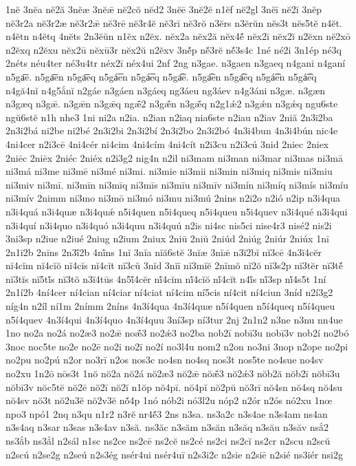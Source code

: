 {1nĕ
3nĕa
nĕ2ă
3nĕæ
3nĕǣ
nĕ2cŏ
nĕd2
3nĕē
3nĕ2ĕ
n1ĕf
nĕ2gl
3nĕī
nĕ2ĭ
3nĕp
nĕ3r2a
nĕ3r2æ
nĕ3r2ǣ
nĕ3rē
nĕ3r4ĕ
nĕ3rī
nĕ3rŏ
n3ĕrs
n3ĕrŭn
nĕs3t
nĕs5tĕ
n4ĕt.
n4ĕtn
n4ĕtq
4nĕts
2n3ĕŭn
n1ĕx
n2ĕx.
nĕx2a
nĕx2ă
nĕx4ĕ́
nĕx2ī
nĕx2ĭ
n2ĕxn
nĕ2xō
n2ĕxq
n2ĕxu
nĕx2ū
nĕxū3r
nĕx2ŭ
n2ĕxv
3nĕ́p
nĕ́3rĕ
nĕ́3s4c
1né
né2i
3n1ép
né3q
2néts
néu4ter
né3u4tr
néx2ī
néx4ui
2nf
2ng
n3gae.
n3gaen
n3gaeq
n4gani
n4ganí
n5ga͞e.
n5ga͞en
n5ga͞eq
n5gá͞en
n5gá͞eq
n5ga͡e.
n5ga͡en
n5ga͡eq
n5gá͡en
n5gá͡eq
n4gă4nĭ
n4g5ắnĭ
n2gáe
n3gáen
n3gáeq
ng3áeu
ng3áev
n4g3áni
n3gæ.
n3gæn
n3gæq
n3gǣ.
n3gǣn
n3gǣq
ngǣ́2
n3gǣ́n
n3gǣ́q
n2g1ǽ2
n3gǽn
n3gǽq
ngu6ste
ngŭ6stĕ
n1h
nhe3
1ni
ni2a
n2ia.
n2ian
n2iaq
nia6ste
n2iau
n2iav
2niă
2n3i2ba
2n3i2bá
ni2be
ni2bé
2n3i2bi
2n3i2bí
2n3i2bo
2n3i2bó
4n3i4bun
4n3i4bún
nic4e
4ni4cer
n2i3cē
4ni4cér
ni4cim
4ni4cím
4ni4cít
n2i3cu
n2i3cú
3nid
2niec
2niex
2niēc
2niēx
2niéc
2niéx
n2i3g2
nig4n
n2il
ni3mam
ni3man
ni3mar
ni3mas
ni3mā
ni3má
ni3me
ni3mē
ni3mé
ni3mi.
ni3mie
ni3mii
ni3min
ni3miq
ni3mis
ni3miu
ni3miv
ni3mī.
ni3mīn
ni3mīq
ni3mīs
ni3mīu
ni3mīv
ni3mín
ni3míq
ni3mís
ni3míu
ni3mív
2nimm
ni3mo
ni3mō
ni3mó
ni3mu
ni3mú
2nins
n2i2o
n2ió
n2ip
n3i4qua
n3i4quá
n3i4quæ
n3i4quǽ
n5i4quen
n5i4queq
n5i4queu
n5i4quev
n3i4qué
n3i4qui
n3i4quí
n3i4quo
n3i4quó
n3i4quu
n3i4quú
n2is
ni4sc
nis5ci
nise4r3
nisé2
nis2i
3ni3sp
n2iue
n2iué
2niug
n2ium
2niux
2niū
2niŭ
2niúd
2niúg
2niúr
2niúx
1nī
2n1ī2b
2nīns
2n3ī́2b
4nī́ns
1nĭ
3nĭa
nĭă6stĕ
3nĭæ
3nĭǣ
n3ĭ2bĭ
nĭ3cē
4n3ĭ4cĕr
nĭ4cĭm
nĭ4cĭŏ
nĭ4cĭs
nĭ4cĭt
nĭ3cŭ
3nĭd
3nĭī
nĭ3mĭĕ
2nĭmŏ
nĭ2ŏ
nĭ3s2p
nĭ3tĕr
nĭ3tĕ́
nĭ3tĭs
nĭ5tĭ́s
nĭ3tŏ
n3ĭ4tūs
4n5ĭ́4cĕr
nĭ́4cĭm
nĭ́4cĭŏ
nĭ́4cĭt
n4ĭ́s
nĭ́3sp
nĭ́4s5t
1ní
2n1í2b
4ní4cer
ní4cian
ní4ciar
ní4ciat
ní4cim
ní5cis
ní4cit
ní4ciun
3níd
n2í3g2
níg4n
n2íl
ní1m
2nímm
2níns
4n3í4qua
4n3í4quæ
n5í4quen
n5í4queq
n5í4queu
n5í4quev
4n3í4qui
4n3í4quo
4n3í4quu
3ní3sp
ní3tur
2nj
2n1n2
n3ne
n3nu
nn4ue
1no
no2a
no2á
no2æ3
no2ǣ
noǣ́3
no2ǽ3
no2ba
nob2ī
nobī3u
nobī3v
nob2í
no2bó
3noc
noc5te
no2e
no2ē
no2i
no2ī
no2í
no3l4u
nom2
n2on
no3ni
3nop
n2ope
no2pi
no2pu
no2pú
n2or
no3rī
n2os
nos3c
no4sn
no4sq
nos3t
nos5te
no4sue
no4sv
no2xu
1n2ō
nōs3t
1nŏ
nŏ2a
nŏ2á
nŏ2æ3
nŏ2ǣ
nŏǣ́3
nŏ2ǽ3
nŏb2ă
nŏb2ī
nŏbī3u
nŏbī3v
nŏc5tĕ
nŏ2ē
nŏ2ī
nŏ2ĭ
n1ŏp
nŏ4pī.
nŏ4pĭ
nŏ2pŭ
nŏ3rī
nŏ4sn
nŏ4sq
nŏ4su
nŏ4sv
nŏ3t
nŏ2u3ĕ
nŏ2v3ĕ
nŏ́4p
1nó
nób2i
nó3l2u
nóp2
n2ór
n2ós
nó2xu
1nœ
npo3
npó1
2nq
n3qu
n1r2
n3rĕ
nr4ĕ́3
2ns
n3sa.
ns3a2c
n3s4ae
n3s4am
ns4an
n3s4aq
n3sar
n3sas
n3s4av
n3să.
ns3ăc
n3săm
n3săn
n3săq
n3său
n3săv
nsắ2
ns3ắb
ns3ắl
n2sál
n1sc
ns2ce
ns2cē
ns2cĕ
ns2cé
ns2ci
ns2cĭ
ns2cr
n2scu
n2scŭ
n2scú
n2se2g
n2seú
n2s3ég
nsér4ui
nsér4uī
n2s3i2c
n2sie
n2siē
n2sié
ns3iér
nsi2g
}
